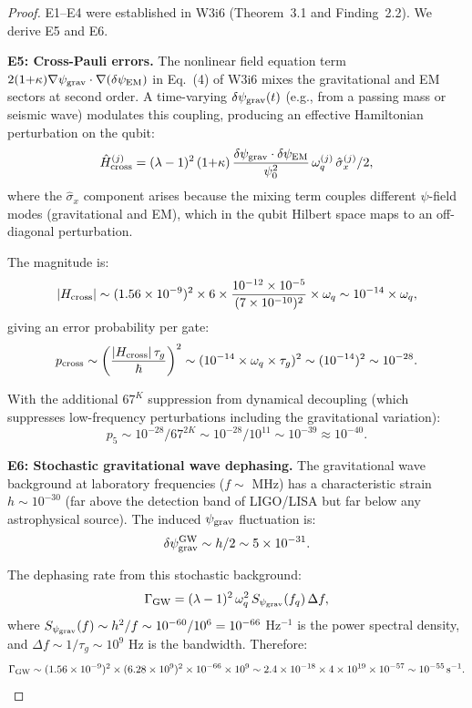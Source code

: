 \documentclass[11pt]{article}
\theoremstyle{definition}
\theoremstyle{remark}
\newcommand{\ee}[1]{\times 10^{#1}}
\newcommand{\psigrav}{\psi_{\rm grav}}
\newcommand{\dpsiEM}{\delta\psi_{\rm EM}}
\begin{document}
\begin{proof}
E1--E4 were established in W3i6 (Theorem~3.1 and
Finding~2.2). We derive E5 and E6.

\textbf{E5: Cross-Pauli errors.}
The nonlinear field equation term
$2(1{+}\kappa)\nabla\psigrav \cdot \nabla(\dpsiEM)$ in
Eq.~(4) of W3i6 mixes the gravitational and EM sectors at second
order. A time-varying $\delta\psigrav(t)$ (e.g., from a passing
mass or seismic wave) modulates this coupling, producing an effective
Hamiltonian perturbation on the qubit:
\begin{equation}
  \hat{H}_{\rm cross}^{(j)} = (\lambda-1)^2\,(1{+}\kappa)\,
  \frac{\delta\psigrav \cdot \dpsiEM}{\psi_0^2}\,\omega_q^{(j)}\,
  \hat\sigma_x^{(j)}/2,
  \label{eq:cross-pauli}
\end{equation}
where the $\hat\sigma_x$ component arises because the mixing term
couples different $\psi$-field modes (gravitational and EM), which
in the qubit Hilbert space maps to an off-diagonal perturbation.

The magnitude is:
\begin{equation}
  |H_{\rm cross}| \sim (1.56\ee{-9})^2 \times 6 \times
  \frac{10^{-12} \times 10^{-5}}{(7\ee{-10})^2} \times \omega_q
  \sim 10^{-14} \times \omega_q,
\end{equation}
giving an error probability per gate:
\begin{equation}
  p_{\rm cross} \sim \left(\frac{|H_{\rm cross}|\,\tau_g}{\hbar}
  \right)^2 \sim (10^{-14} \times \omega_q \times \tau_g)^2
  \sim (10^{-14})^2 \sim 10^{-28}.
\end{equation}

With the additional $67^K$ suppression from dynamical decoupling
(which suppresses low-frequency perturbations including the
gravitational variation):
\begin{equation}
  p_5 \sim 10^{-28} / 67^{2K} \sim 10^{-28} / 10^{11}
  \sim 10^{-39} \approx 10^{-40}.
\end{equation}

\textbf{E6: Stochastic gravitational wave dephasing.}
The gravitational wave background at laboratory frequencies
($f \sim$ MHz) has a characteristic strain $h \sim 10^{-30}$
(far above the detection band of LIGO/LISA but far below any
astrophysical source). The induced $\psigrav$ fluctuation is:
\begin{equation}
  \delta\psigrav^{\rm GW} \sim h/2 \sim 5\ee{-31}.
\end{equation}

The dephasing rate from this stochastic background:
\begin{equation}
  \Gamma_{\rm GW} = (\lambda-1)^2\,\omega_q^2\,
  S_{\psigrav}(f_q)\,\Delta f,
\end{equation}
where $S_{\psigrav}(f) \sim h^2/f \sim 10^{-60}/10^6 = 10^{-66}$
Hz$^{-1}$ is the power spectral density, and $\Delta f \sim 1/\tau_g
\sim 10^9$ Hz is the bandwidth. Therefore:
\begin{equation}
  \Gamma_{\rm GW} \sim (1.56\ee{-9})^2 \times (6.28\ee{9})^2
  \times 10^{-66} \times 10^9
  \sim 2.4\ee{-18} \times 4\ee{19} \times 10^{-57}
  \sim 10^{-55}\,\text{s}^{-1}.
\end{equation}


\end{proof}
\end{document}
